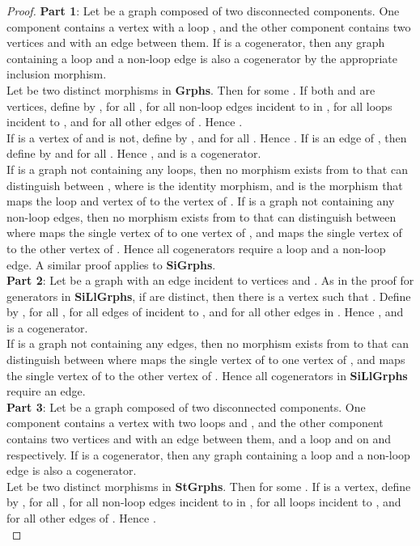 \documentclass[11pt]{article}
\begin{document}
\begin{proof}
\textbf{Part 1}: Let  be a graph composed of two disconnected components. One component contains a vertex  with a loop , and the other component contains two vertices  and  with an edge  between them. If  is a cogenerator, then any graph containing a loop and a non-loop edge is also a cogenerator by the appropriate inclusion morphism.\\
\indent Let  be two distinct morphisms in \textbf{Grphs}. Then  for some . If both  and  are vertices, define  by ,  for all ,  for all non-loop edges  incident to  in ,  for all loops  incident to , and  for all other edges  of . Hence .\\
\indent If  is a vertex of  and  is not, define  by ,  and  for all . Hence . If  is an edge of , then define  by  and  for all . Hence , and  is a cogenerator.\\
\indent If  is a graph not containing any loops, then no morphism exists from  to  that can distinguish between , where  is the identity morphism, and  is the morphism that maps the loop and vertex of  to the vertex of . If  is a graph not containing any non-loop edges, then no morphism exists from  to  that can distinguish between  where  maps the single vertex of  to one vertex of , and  maps the single vertex of  to the other vertex of . Hence all cogenerators require a loop and a non-loop edge. A similar proof applies to \textbf{SiGrphs}.\\
\indent \textbf{Part 2}: Let  be a graph with an edge  incident to vertices  and . As in the proof for generators in \textbf{SiLlGrphs}, if  are distinct, then there is a vertex  such that . Define  by ,  for all ,  for all edges of  incident to , and  for all other edges in . Hence , and  is a cogenerator.\\
\indent If  is a graph not containing any edges, then no morphism exists from  to  that can distinguish between  where  maps the single vertex of  to one vertex of , and  maps the single vertex of  to the other vertex of . Hence all cogenerators in \textbf{SiLlGrphs} require an edge.\\
\indent \textbf{Part 3}: Let  be a graph composed of two disconnected components. One component contains a vertex  with two loops  and , and the other component contains two vertices  and  with an edge  between them, and a loop  and  on  and  respectively. If  is a cogenerator, then any graph containing a loop and a non-loop edge is also a cogenerator.\\
\indent Let  be two distinct morphisms in \textbf{StGrphs}. Then  for some . If  is a vertex, define  by ,  for all ,  for all non-loop edges  incident to  in ,  for all loops  incident to , and  for all other edges  of . Hence .\\

\end{proof}
\end{document}
